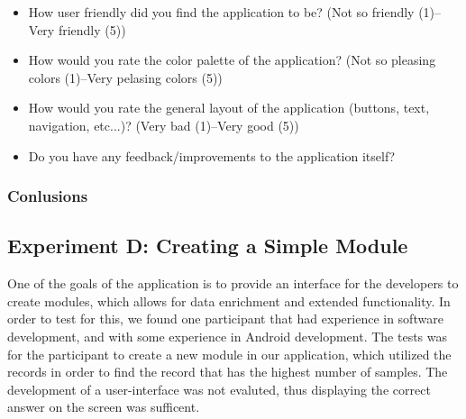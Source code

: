 \begin{itemize}
    \item How user friendly did you find the application to be? (Not so friendly (1)--Very friendly (5))
    \item How would you rate the color palette of the application? (Not so pleasing colors (1)--Very pelasing colors (5))
    \item How would you rate the general layout of the application (buttons, text, navigation, etc...)? (Very bad (1)--Very good (5))
    \item Do you have any feedback/improvements to the application itself?
    \begin{description}[font=\normalfont\itshape]
        \item[Participent A:]
        \item[Participent B:] 
    \end{description}
\end{itemize}


\subsubsection{Conlusions}

\subsection{Experiment D: Creating a Simple Module}
One of the goals of the application is to provide an interface for the developers to create modules, which allows for data enrichment and extended functionality. In order to test for this, we found one participant that had experience in software development, and with some experience in Android development. The tests was for the participant to create a new module in our application, which utilized the records in order to find the record that has the highest number of samples. The development of a user-interface was not evaluted, thus displaying the correct answer on the screen was sufficent. 

